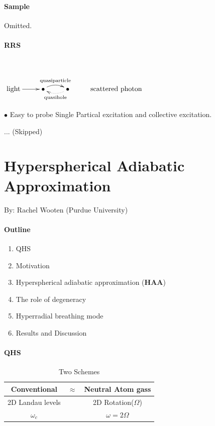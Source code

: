 \documentclass{article}
\numberwithin{equation}{subsection} %
\theoremstyle{definition}
\begin{document}
\paragraph{Sample} Omitted.
\paragraph{RRS}
$ $ %

$ \xymatrix{
    \text{light}\ar[r] &
    \bullet\ar@/^/[r]^{\text{quasiparticle}}
                \ar@/_/@{<.}[r]_{\text{quasihole}} & 
    \bullet & \text{scattered photon}
}$

$\bullet$ Easy to probe Single Partical excitation and collective
excitation.

... (Skipped)

\section{Hyperspherical Adiabatic Approximation}
\label{sec:Hyperspherical-adiabatic-Approximation}

By: Rachel Wooten (Purdue University)

\paragraph{Outline}
\begin{enumerate}
    \item QHS
    \item Motivation
    \item Hyperspherical adiabatic approximation (\textbf{HAA})
    \item The role of degeneracy
    \item Hyperradial breathing mode
    \item Results and Discussion
\end{enumerate}

\paragraph{QHS}
\begin{table}[H]
    \caption{Two Schemes}
    \centering
    \begin{tabular}{|ccc|}
        \hline
        Conventional     & $\approx$ & Neutral Atom gass \\
        \hline
        2D Landau levels &           & 2D Rotation($\Omega$) \\
        $\omega_c$       &           & $\omega= 2\Omega$ \\
        \hline
    \end{tabular}
\end{table}
\end{document}
